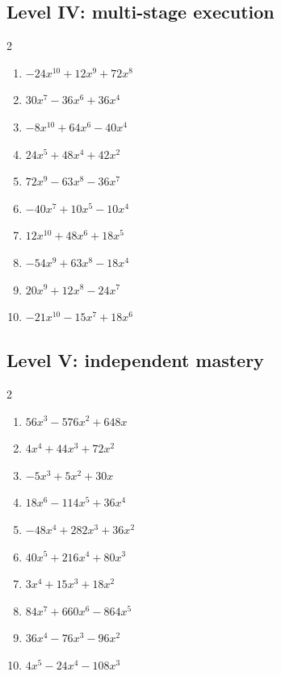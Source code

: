 \documentclass[11pt,oneside]{book}
\begin{document}
\subsection*{Level IV: multi-stage execution}
\begin{multicols}{2}
\begin{enumerate}[leftmargin=*,label=\textbf{\arabic*.},itemsep=0.65\baselineskip]
\item $ - 24 x^{10} + 12 x^{9} + 72 x^{8} $
\item $ 30 x^{7} - 36 x^{6} + 36 x^{4} $
\item $ - 8 x^{10} + 64 x^{6} - 40 x^{4} $
\item $ 24 x^{5} + 48 x^{4} + 42 x^{2} $
\item $ 72 x^{9} - 63 x^{8} - 36 x^{7} $
\item $ - 40 x^{7} + 10 x^{5} - 10 x^{4} $
\item $ 12 x^{10} + 48 x^{6} + 18 x^{5} $
\item $ - 54 x^{9} + 63 x^{8} - 18 x^{4} $
\item $ 20 x^{9} + 12 x^{8} - 24 x^{7} $
\item $ - 21 x^{10} - 15 x^{7} + 18 x^{6} $
\end{enumerate}
\end{multicols}
\subsection*{Level V: independent mastery}
\begin{multicols}{2}
\begin{enumerate}[leftmargin=*,label=\textbf{\arabic*.},itemsep=0.65\baselineskip]
\item $ 56 x^{3} - 576 x^{2} + 648 x $
\item $ 4 x^{4} + 44 x^{3} + 72 x^{2} $
\item $ - 5 x^{3} + 5 x^{2} + 30 x $
\item $ 18 x^{6} - 114 x^{5} + 36 x^{4} $
\item $ - 48 x^{4} + 282 x^{3} + 36 x^{2} $
\item $ 40 x^{5} + 216 x^{4} + 80 x^{3} $
\item $ 3 x^{4} + 15 x^{3} + 18 x^{2} $
\item $ 84 x^{7} + 660 x^{6} - 864 x^{5} $
\item $ 36 x^{4} - 76 x^{3} - 96 x^{2} $
\item $ 4 x^{5} - 24 x^{4} - 108 x^{3} $
\end{enumerate}
\end{multicols}
\end{document}
